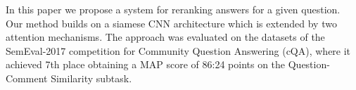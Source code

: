 In this paper we propose a system for reranking answers for a given question. Our method builds on a siamese CNN architecture which is extended by two attention mechanisms. The approach was evaluated on the datasets of the SemEval-2017 competition for Community Question Answering (cQA), where it achieved 7th place obtaining a MAP score of 86:24 points on the Question-Comment Similarity subtask.

